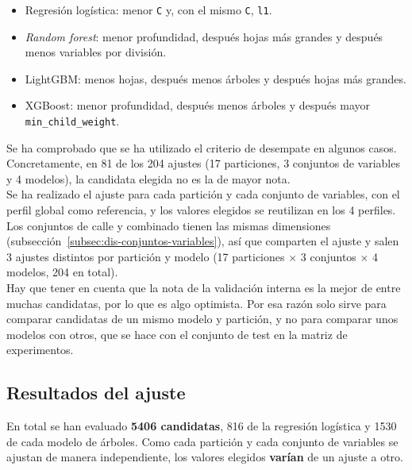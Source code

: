 \begin{itemize}
  \item Regresión logística: menor \texttt{C} y, con el mismo \texttt{C}, \texttt{l1}.
  \item \textit{Random forest}: menor profundidad, después hojas más grandes y después menos variables por división.
  \item LightGBM: menos hojas, después menos árboles y después hojas más grandes.
  \item XGBoost: menor profundidad, después menos árboles y después mayor \texttt{min\_child\_weight}.
\end{itemize}

Se ha comprobado que se ha utilizado el criterio de desempate en algunos casos. Concretamente, en 81 de los 204 ajustes (17 particiones, 3 conjuntos de variables y 4 modelos), la candidata elegida no es la de mayor nota.
\\

Se ha realizado el ajuste para cada partición y cada conjunto de variables, con el perfil global como referencia, y los valores elegidos se reutilizan en los 4 perfiles.
\\

Los conjuntos de calle y combinado tienen las mismas dimensiones (subsección~\ref{subsec:dis-conjuntos-variables}), así que comparten el ajuste y salen 3 ajustes distintos por partición y modelo (17 particiones $\times$ 3 conjuntos $\times$ 4 modelos, 204 en total).
\\

Hay que tener en cuenta que la nota de la validación interna es la mejor de entre muchas candidatas, por lo que es algo optimista. Por esa razón solo sirve para comparar candidatas de un mismo modelo y partición, y no para comparar unos modelos con otros, que se hace con el conjunto de test en la matriz de experimentos.
\\

\subsection{Resultados del ajuste}
\label{subsec:dis-resultados-ajuste}

En total se han evaluado \textbf{5406 candidatas}, 816 de la regresión logística y 1530 de cada modelo de árboles. Como cada partición y cada conjunto de variables se ajustan de manera independiente, los valores elegidos \textbf{varían} de un ajuste a otro.
\\

